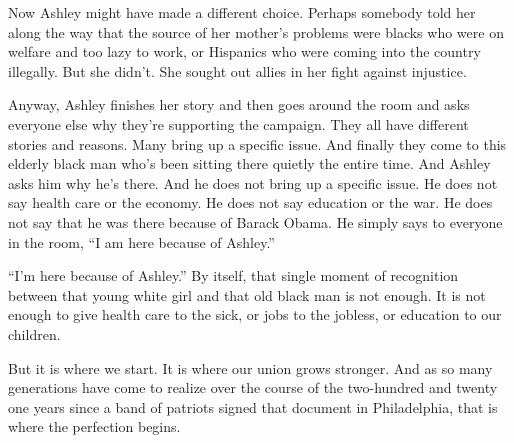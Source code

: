 \documentclass[10pt,a4paper]{article}
\begin{document}
Now Ashley might have made a different choice. Perhaps somebody told her along the way that the source of her mother’s problems were blacks who were on welfare and too lazy to work, or Hispanics who were coming into the country illegally. But she didn’t. She sought out allies in her fight against injustice.

Anyway, Ashley finishes her story and then goes around the room and asks everyone else why they’re supporting the campaign. They all have different stories and reasons. Many bring up a specific issue. And finally they come to this elderly black man who’s been sitting there quietly the entire time. And Ashley asks him why he’s there. And he does not bring up a specific issue. He does not say health care or the economy. He does not say education or the war. He does not say that he was there because of Barack Obama. He simply says to everyone in the room, “I am here because of Ashley.” 

“I’m here because of Ashley.” By itself, that single moment of recognition between that young white girl and that old black man is not enough. It is not enough to give health care to the sick, or jobs to the jobless, or education to our children.

But it is where we start. It is where our union grows stronger. And as so many generations have come to realize over the course of the two-hundred and twenty one years since a band of patriots signed that document in Philadelphia, that is where the perfection begins.
\end{document}
